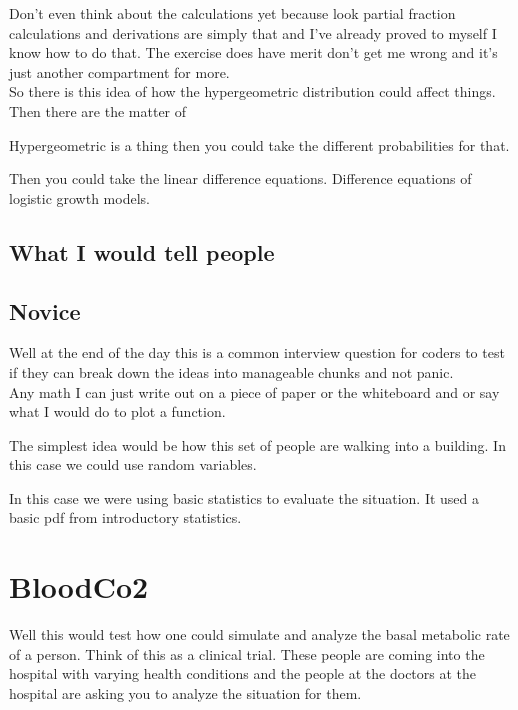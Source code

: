 Don't even think about the calculations yet because look partial fraction calculations and derivations are simply that and I've already proved to myself I know how to do that. The exercise does have merit don't get me wrong and it's just another compartment for more. \\


So there is this idea of how the hypergeometric distribution could affect things. Then there are the matter of 

        
Hypergeometric is a thing then you could take the different probabilities for that.  

Then you could take the linear difference equations. Difference equations of logistic growth models. 




\subsection{What I would tell people}

\subsection{Novice}


Well at the end of the day this is a common interview question for coders to test if they can break down the ideas into manageable chunks and not panic. \\

Any math I can just write out on a piece of paper or the whiteboard and or say what I would do to plot a function. 

The simplest idea would be how this set of people are walking into a building. In this case we could use random variables. 

In this case we were using basic statistics to evaluate the situation. It used a basic pdf from introductory statistics. \\ 






\section{BloodCo2}

Well this would test how one could simulate and analyze the basal metabolic rate of a person. Think of this as a clinical trial. These people are coming into the hospital with varying health conditions and the people at the doctors at the hospital are asking you to analyze the situation for them. \\ 

